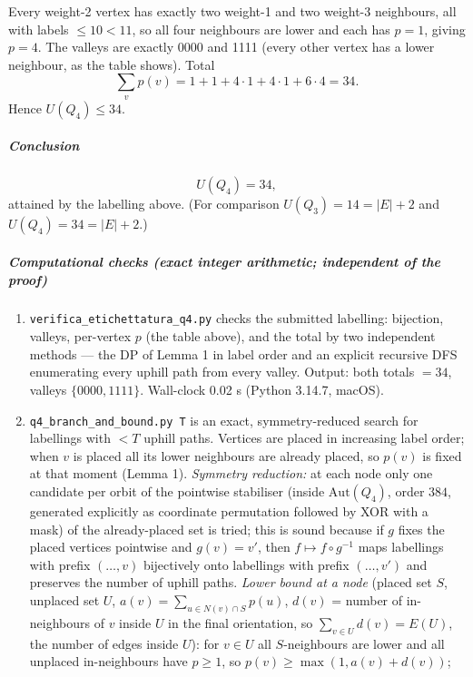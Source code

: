 \documentclass[11pt,a4paper]{article}
\begin{document}
Every weight-2 vertex has exactly two weight-1 and two weight-3
neighbours, all with labels \(\le10<11\), so all four neighbours are
lower and each has \(p=1\), giving \(p=4\). The valleys are exactly 0000
and 1111 (every other vertex has a lower neighbour, as the table shows).
Total \[\sum_v p(v)=1+1+4\cdot1+4\cdot1+6\cdot4=34 .\] Hence
\(U(Q_4)\le34\).

\subparagraph{Conclusion}\label{conclusion}

\[U(Q_4)=34,\] attained by the labelling above. (For comparison
\(U(Q_3)=14=|E|+2\) and \(U(Q_4)=34=|E|+2\).)

\subparagraph{Computational checks (exact integer arithmetic;
independent of the
proof)}\label{computational-checks-exact-integer-arithmetic-independent-of-the-proof}

\begin{enumerate}
\def\labelenumi{\arabic{enumi}.}
\item
  \texttt{verifica\_etichettatura\_q4.py} checks the submitted
  labelling: bijection, valleys, per-vertex \(p\) (the table above), and
  the total by two independent methods --- the DP of Lemma 1 in label
  order and an explicit recursive DFS enumerating every uphill path from
  every valley. Output: both totals \(=34\), valleys \(\{0000,1111\}\).
  Wall-clock 0.02 s (Python 3.14.7, macOS).
\item
  \texttt{q4\_branch\_and\_bound.py\ T} is an exact, symmetry-reduced
  search for labellings with \(<T\) uphill paths. Vertices are placed in
  increasing label order; when \(v\) is placed all its lower neighbours
  are already placed, so \(p(v)\) is fixed at that moment (Lemma 1).
  \emph{Symmetry reduction:} at each node only one candidate per orbit
  of the pointwise stabiliser (inside \(\mathrm{Aut}(Q_4)\), order
  \(384\), generated explicitly as coordinate permutation followed by
  XOR with a mask) of the already-placed set is tried; this is sound
  because if \(g\) fixes the placed vertices pointwise and \(g(v)=v'\),
  then \(f\mapsto f\circ g^{-1}\) maps labellings with prefix
  \((\dots,v)\) bijectively onto labellings with prefix \((\dots,v')\)
  and preserves the number of uphill paths. \emph{Lower bound at a node}
  (placed set \(S\), unplaced set \(U\),
  \(a(v)=\sum_{u\in N(v)\cap S}p(u)\), \(d(v)\) = number of
  in-neighbours of \(v\) inside \(U\) in the final orientation, so
  \(\sum_{v\in U}d(v)=E(U)\), the number of edges inside \(U\)): for
  \(v\in U\) all \(S\)-neighbours are lower and all unplaced
  in-neighbours have \(p\ge1\), so \(p(v)\ge\max(1,a(v)+d(v))\);

\end{enumerate}
\end{document}
